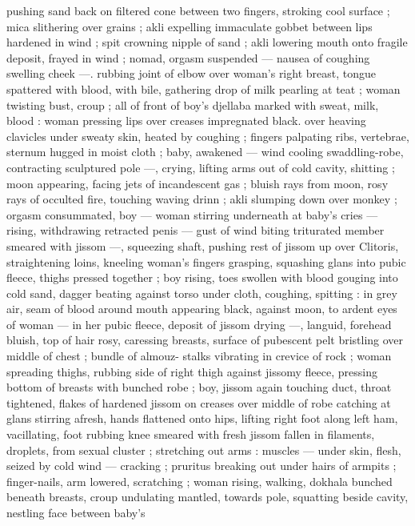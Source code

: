 pushing sand back on filtered cone between two fingers, stroking 
cool surface ; mica slithering over grains ; akli expelling immaculate 
gobbet between lips hardened in wind ; spit crowning nipple of sand 
; akli lowering mouth onto fragile deposit, frayed in wind ; nomad, 
orgasm suspended --- nausea of coughing swelling cheek ---. 
rubbing joint of elbow over woman's right breast, tongue spattered 
with blood, with bile, gathering drop of milk pearling at teat ; woman 
twisting bust, croup ; all of front of boy's djellaba marked with sweat, 
milk, blood : woman pressing lips over creases impregnated black. 
over heaving clavicles under sweaty skin, heated by coughing ; 
fingers palpating ribs, vertebrae, sternum hugged in moist cloth ; 
baby, awakened --- wind cooling swaddling-robe, contracting 
sculptured pole ---, crying, lifting arms out of cold cavity, shitting ; 
moon appearing, facing jets of incandescent gas ; bluish rays from 
moon, rosy rays of occulted fire, touching waving drinn ; akli 
slumping down over monkey ; orgasm consummated, boy --- woman 
stirring underneath at baby's cries --- rising, withdrawing retracted 
penis --- gust of wind biting triturated member smeared with jissom 
---, squeezing shaft, pushing rest of jissom up over Clitoris, 
straightening loins, kneeling woman's fingers grasping, squashing 
glans into pubic fleece, thighs pressed together ; boy rising, toes 
swollen with blood gouging into cold sand, dagger beating against 
torso under cloth, coughing, spitting : in grey air, seam of blood 
around mouth appearing black, against moon, to ardent eyes of 
woman --- in her pubic fleece, deposit of jissom drying ---, languid, 
forehead bluish, top of hair rosy, caressing breasts, surface of 
pubescent pelt bristling over middle of chest ; bundle of almouz- 
stalks vibrating in crevice of rock ; woman spreading thighs, rubbing 
side of right thigh against jissomy fleece, pressing bottom of breasts 
with bunched robe ; boy, jissom again touching duct, throat 
tightened, flakes of hardened jissom on creases over middle of robe 
catching at glans stirring afresh, hands flattened onto hips, lifting 
right foot along left ham, vacillating, foot rubbing knee smeared with 
fresh jissom fallen in filaments, droplets, from sexual cluster ; 
stretching out arms : muscles --- under skin, flesh, seized by cold 
wind --- cracking ; pruritus breaking out under hairs of armpits ; 
finger-nails, arm lowered, scratching ; woman rising, walking, 
dokhala bunched beneath breasts, croup undulating mantled, 
towards pole, squatting beside cavity, nestling face between baby's 
